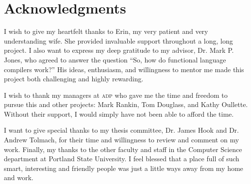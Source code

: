 \section*{Acknowledgments}
I wish to give my heartfelt thanks to Erin, my very patient and very understanding
wife. She provided invaluable support throughout a long, long
project. I also want to express my deep gratitude to my advisor, Dr. Mark P. Jones, who
agreed to answer the question ``So, how do functional language compilers
work?'' His ideas, enthusiasm, and willingness to mentor me made this
project both challenging and highly rewarding. 

I wish to thank my managers at \textsc{adp} who gave me the time and
freedom to pursue this and other projects: Mark Rankin, Tom Douglass,
and Kathy Oullette. Without their support, I would simply have not
been able to afford the time.

I want to give special thanks to my thesis committee, Dr. James Hook
and Dr. Andrew Tolmach, for their time and willingness to review and
comment on my work. Finally, my thanks to the other faculty and staff in the
Computer Science department at Portland State University. I feel
blessed that a place full of such smart, interesting and friendly
people was just a little ways away from my home and work.

\newpage

\singlespacing
\tableofcontents
\newpage
{}
\listoffigures
\newpage

